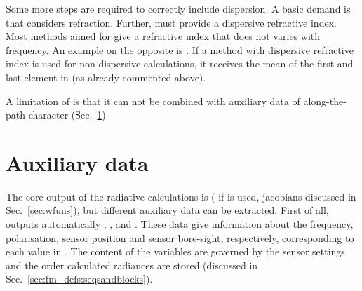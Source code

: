 Some more steps are required to correctly include dispersion. A basic demand is
that  considers refraction. Further,
 must provide a dispersive refractive index. Most
methods aimed for  give a refractive index that
does not varies with frequency. An example on the opposite is
. If a method with dispersive refractive
index is used for non-dispersive calculations, it receives the mean of the
first and last element in  (as already commented above).

A limitation of  is that it can not be combined
with auxiliary data of along-the-path character (Sec.~\ref{sec:fm_defs:aux})






\section{Auxiliary data}
\label{sec:fm_defs:aux}

The core output of the radiative calculations is 
( if  is used, jacobians discussed in
Sec.~\ref{sec:wfuns}), but different auxiliary data can be extracted. First of
all,  outputs automatically , ,
 and . These data give information about the
frequency, polarisation, sensor position and sensor bore-sight, respectively,
corresponding to each value in . The content of the variables are
governed by the sensor settings and the order calculated radiances are stored
(discussed in Sec.~\ref{sec:fm_defs:seqsandblocks}).

